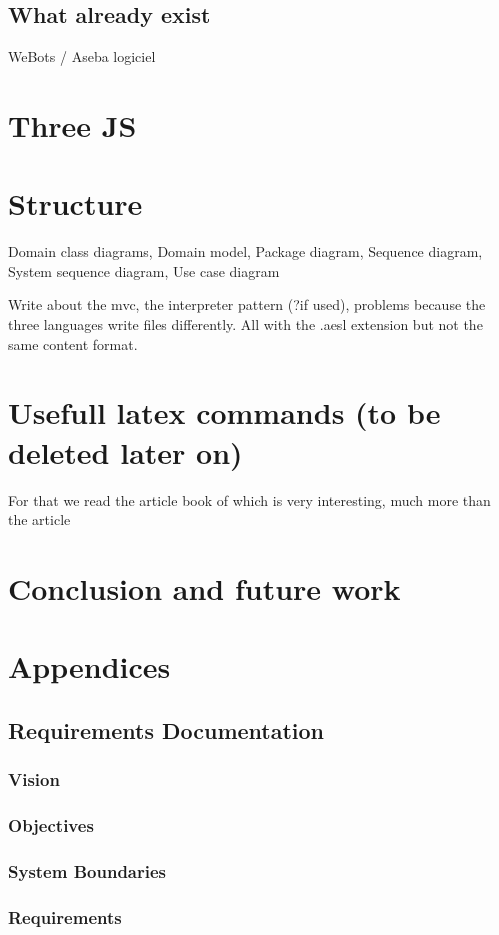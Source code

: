 \documentclass{scrartcl}
\begin{document}
\subsection{What already exist} 
WeBots / Aseba logiciel
\section{Three JS}

\section{Structure}
Domain class diagrams,
Domain model,
Package diagram,
Sequence diagram,
System sequence diagram,
Use case diagram

Write about the mvc, the interpreter pattern (?if used), problems because the three languages write files differently. All with the .aesl extension but not the same content format.


\section{Usefull latex commands (to be deleted later on)}
For that we read the article book of \cite{Jerald:2015:VBH:2792790}
which is very interesting, much more than the article
\cite{Diniz:2017:UGO:3100317.3100324}

\section{Conclusion and future work}

\section{Appendices}
\subsection{Requirements Documentation}
\subsubsection{Vision}
\subsubsection{Objectives}
\subsubsection{System Boundaries}
\subsubsection{Requirements}
\end{document}
